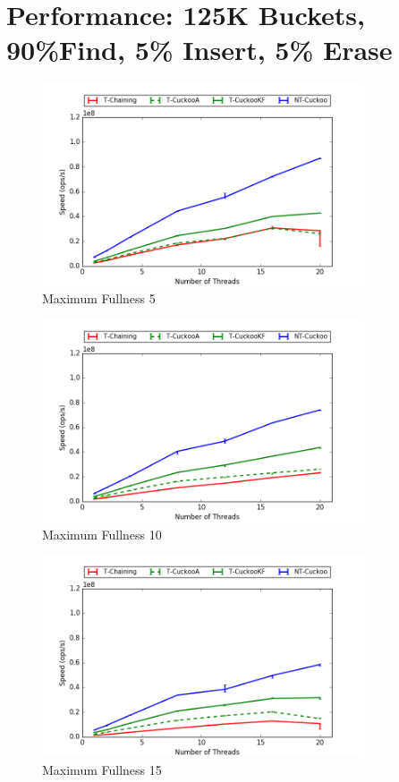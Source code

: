 \section{Performance: 125K Buckets, 90\%Find, 5\% Insert, 5\% Erase}
\begin{figure}[H]
    \centering
	\includegraphics[width=0.85\textwidth]{maps/5HM125K:F90,I5,E5.png} 
        \caption*{Maximum Fullness 5}
\end{figure}
\begin{figure}[H]
    \centering
	\includegraphics[width=0.85\textwidth]{maps/10HM125K:F90,I5,E5.png} 
        \caption*{Maximum Fullness 10}
\end{figure}
\begin{figure}[H]
    \centering
	\includegraphics[width=0.85\textwidth]{maps/15HM1M:F90,I5,E5.png} 
        \caption*{Maximum Fullness 15}
\end{figure}


